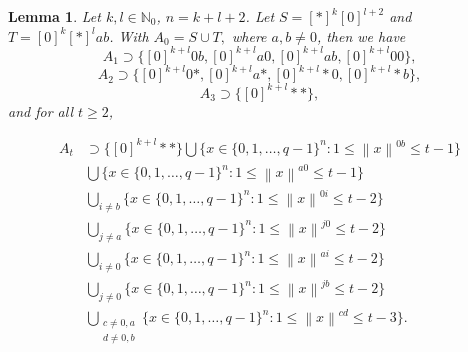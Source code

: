 \documentclass[reqno,11pt]{amsart}
\newtheorem{lemma}[theorem]{Lemma}
\renewcommand{\leq}{\leqslant}
\renewcommand{\geq}{\geqslant}
\begin{document}
\begin{lemma} \label{lemma:ST3}
Let $k,l \in \mathbb{N}_0$, $n=k+l+2$. Let $S=[*]^k[0]^{l+2}$ and $T=[0]^k[*]^lab$. With $A_0=S \cup T,$ where $a,b \neq 0$, then we have
$$A_1 \supset \{[0]^{k+l}0b,[0]^{k+l}a0,[0]^{k+l}ab,[0]^{k+l}00\},$$
$$A_2 \supset \{[0]^{k+l}0*,[0]^{k+l}a*,[0]^{k+l}*0,[0]^{k+l}*b\},$$
$$A_3 \supset \{[0]^{k+l}**\},$$
and for all $t \geq 2$,

\begin{align}
 A_t & \supset \{[0]^{k+l}**\}\label{eq:0b}
 \bigcup\{x \in \{0,1,\dots,q-1\}^n:  1 \leq \left \lVert x \right \rVert^{0b} \leq t-1\}\\ 
 \label{eq:a0}
&\bigcup \{x \in \{0,1,\dots,q-1\}^n:  1 \leq \left \lVert x \right \rVert^{a0} \leq t-1\}\\ 
\label{eq:0i}
&\bigcup_{i \neq b} \{x \in \{0,1,\dots,q-1\}^n:  1 \leq \left \lVert x \right \rVert^{0i} \leq t-2\} \\  
\label{eq:jo}
&\bigcup_{j \neq a} \{x \in \{0,1,\dots,q-1\}^n:  1 \leq \left \lVert x \right \rVert^{j0} \leq t-2\} \\ 
\label{eq:ai}
&\bigcup_{i \neq 0} \{x \in \{0,1,\dots,q-1\}^n:  1 \leq \left \lVert x \right \rVert^{ai} \leq t-2\} \\ 
\label{eq:jb}
&\bigcup_{j \neq 0} \{x \in \{0,1,\dots,q-1\}^n:  1 \leq \left \lVert x \right \rVert^{jb} \leq t-2\} \\ 
\label{eq:cd}
&\bigcup_{\substack{c \neq 0,a \\ d \neq 0,b}} \{x \in \{0,1,\dots,q-1\}^n:  1 \leq \left \lVert x \right \rVert^{cd} \leq t-3\}. 
 \end{align}




\end{lemma}
\end{document}
